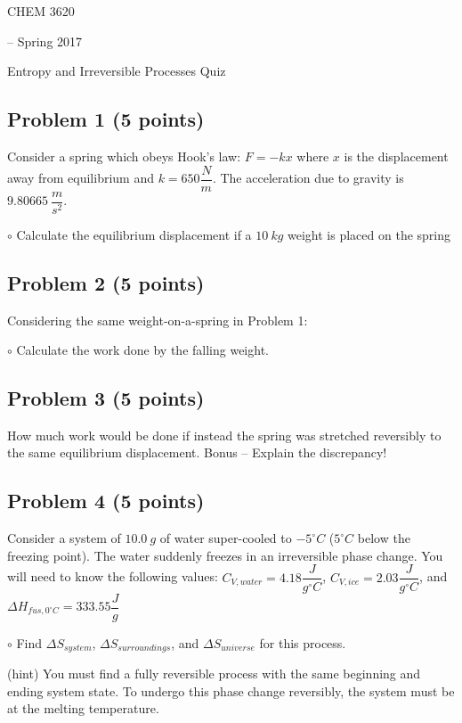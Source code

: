 \documentclass[12pt, letterpaper]{memoir}
\begin{document}
	\begin{center}
		{\Large CHEM 3620}
		{\large-- Spring 2017
		
		Entropy and Irreversible Processes Quiz}
	\end{center}
		
	\subsection*{Problem 1 (5 points)}
Consider a spring which obeys Hook's law: $F=-kx$ where $x$ is the displacement away from equilibrium and $k=650\dfrac{N}{m}$. The acceleration due to gravity is $9.80665~\dfrac{m}{s^2}$.

$\circ$ Calculate the equilibrium displacement if a $10~kg$ weight is placed on the spring

\noindent 

\vspace{10em}
	
	\subsection*{Problem 2  (5 points)}	
Considering the same weight-on-a-spring in Problem 1:

$\circ$ Calculate the work done by the falling weight.

\vspace{10em}

	\subsection*{Problem 3 (5 points)}
How much work would be done if instead the spring was stretched reversibly to the same equilibrium displacement. Bonus -- Explain the discrepancy!

\vspace{10em}

	\subsection*{Problem 4 (5 points)}
Consider a system of $10.0~g$ of water super-cooled to $- 5^\circ C$ ($5^\circ C$ below the freezing point). The water suddenly freezes in an irreversible phase change. You will need to know the following values: $C_{V,water}=4.18\dfrac{J}{g^\circ C}$, $C_{V,ice}=2.03\dfrac{J}{g^\circ C}$, and $\Delta H_{fus, 0^\circ C} = 333.55 \dfrac{J}{g}$

$\circ$ Find $\Delta S_{system}$, $\Delta S_{surroundings}$, and $\Delta S_{universe}$ for this process.

(hint) You must find a fully reversible process with the same beginning and ending system state. To undergo this phase change reversibly, the system must be at the melting temperature.
\end{document}
